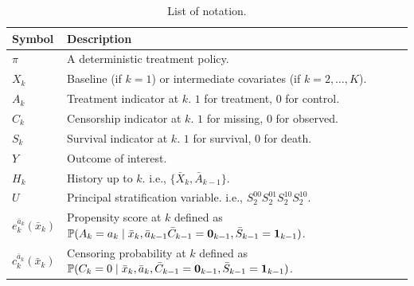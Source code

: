 \documentclass{article}
\newcommand{\pr}{\mathbb{P}}
\newcommand{\tbl}[1]{\caption{#1}}
\begin{document}
\begin{table}[]
\tbl{List of notation.}
{\footnotesize
\begin{tabular}{ll}
Symbol                       & Description                                                                                                                                                       \\ \hline
$\pi$                        & A deterministic treatment policy.                                                                                                                                 \\
$X_k$                        & Baseline (if $k=1$) or intermediate covariates (if $k=2,\dots,K$).                                                                                                 \\
$A_k$                        & Treatment indicator at $k$. $1$ for treatment, $0$ for control.                                                                                                   \\
$C_k$                        & Censorship indicator at $k$. $1$ for missing, $0$ for observed.                                                                                                   \\
$S_k$                        & Survival indicator at $k$. $1$ for survival, $0$ for death.                                                                                                       \\
$Y$                          & Outcome of interest.                                                                                                                                              \\
$H_k$                        & History up to $k$. i.e., $\{\bar X_k, \bar A_{k-1}\}$.                                                                                                            \\
$U$                          & Principal stratification variable. i.e., $S_2^{00}S_2^{01}S_2^{10}S_2^{10}$.                                                                                      \\
$e_k^{\bar a_k}(\bar x_k)$   & Propensity score at $k$ defined as $\pr(A_k=a_k \mid \bar x_k, \bar a_{k-1} \bar C_{k-1}={\bf0}_{k-1}, \bar S_{k-1}={\bf1}_{k-1})$.                               \\
$c_k^{\bar a_k}(\bar x_k)$   & Censoring probability at $k$ defined as $\pr(C_k=0 \mid \bar x_k, \bar a_k, \bar C_{k-1}={\bf0}_{k-1}, \bar S_{k-1}={\bf1}_{k-1})$.                               \\

\end{tabular}}
\end{table}
\end{document}
